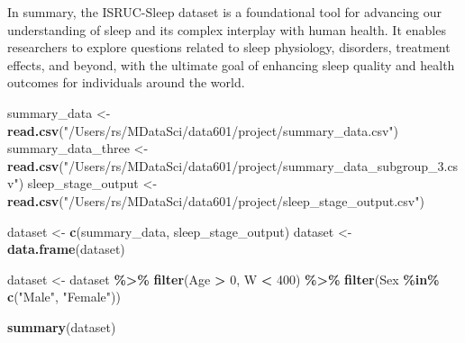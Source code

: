 \documentclass[
]{article}
\newenvironment{Shaded}{\begin{snugshade}}{\end{snugshade}}
\newcommand{\DecValTok}[1]{\textcolor[rgb]{0.00,0.00,0.81}{#1}}
\newcommand{\FunctionTok}[1]{\textcolor[rgb]{0.13,0.29,0.53}{\textbf{#1}}}
\newcommand{\NormalTok}[1]{#1}
\newcommand{\OtherTok}[1]{\textcolor[rgb]{0.56,0.35,0.01}{#1}}
\newcommand{\SpecialCharTok}[1]{\textcolor[rgb]{0.81,0.36,0.00}{\textbf{#1}}}
\newcommand{\StringTok}[1]{\textcolor[rgb]{0.31,0.60,0.02}{#1}}
\begin{document}
In summary, the ISRUC-Sleep dataset is a foundational tool for advancing
our understanding of sleep and its complex interplay with human health.
It enables researchers to explore questions related to sleep physiology,
disorders, treatment effects, and beyond, with the ultimate goal of
enhancing sleep quality and health outcomes for individuals around the
world.

\begin{Shaded}
\begin{Highlighting}[]
\NormalTok{summary\_data }\OtherTok{\textless{}{-}} \FunctionTok{read.csv}\NormalTok{(}\StringTok{"/Users/rs/MDataSci/data601/project/summary\_data.csv"}\NormalTok{)}
\NormalTok{summary\_data\_three }\OtherTok{\textless{}{-}} \FunctionTok{read.csv}\NormalTok{(}\StringTok{"/Users/rs/MDataSci/data601/project/summary\_data\_subgroup\_3.csv"}\NormalTok{)}
\NormalTok{sleep\_stage\_output }\OtherTok{\textless{}{-}} \FunctionTok{read.csv}\NormalTok{(}\StringTok{"/Users/rs/MDataSci/data601/project/sleep\_stage\_output.csv"}\NormalTok{)}

\NormalTok{dataset }\OtherTok{\textless{}{-}} \FunctionTok{c}\NormalTok{(summary\_data, sleep\_stage\_output)}
\NormalTok{dataset }\OtherTok{\textless{}{-}} \FunctionTok{data.frame}\NormalTok{(dataset)}


\NormalTok{dataset }\OtherTok{\textless{}{-}}\NormalTok{ dataset }\SpecialCharTok{\%\textgreater{}\%}
    \FunctionTok{filter}\NormalTok{(Age }\SpecialCharTok{\textgreater{}} \DecValTok{0}\NormalTok{, W }\SpecialCharTok{\textless{}} \DecValTok{400}\NormalTok{) }\SpecialCharTok{\%\textgreater{}\%}
    \FunctionTok{filter}\NormalTok{(Sex }\SpecialCharTok{\%in\%} \FunctionTok{c}\NormalTok{(}\StringTok{"Male"}\NormalTok{, }\StringTok{"Female"}\NormalTok{))}
\end{Highlighting}
\end{Shaded}

\begin{Shaded}
\begin{Highlighting}[]
\FunctionTok{summary}\NormalTok{(dataset)}
\end{Highlighting}
\end{Shaded}
\end{document}

